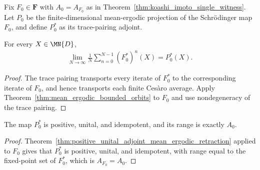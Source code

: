 \begin{definition}
    \label{def:koashi_imoto_mean_ergodic_projection}
    \leanok
    Fix $F_0\in\mathbf F$ with $A_0=A_{F_0}$ as in
    Theorem~\ref{thm:koashi_imoto_single_witness}. Let $P_0$ be the
    finite-dimensional mean-ergodic projection of the Schr\"odinger map $F_0$,
    and define $P_0^*$ as its trace-pairing adjoint.
\end{definition}

\begin{theorem}
    \label{thm:koashi_imoto_heisenberg_cesaro_convergence}
    \leanok
    For every $X\in\MN{D}$,
    \begin{align}
        \lim_{N\to\infty}\frac1N
        \sum_{n=0}^{N-1}(F_0^*)^n(X)
        =P_0^*(X).
        \label{eq:koashi_imoto_heisenberg_cesaro_convergence}
    \end{align}
\end{theorem}

\begin{proof}
    \leanok
    The trace pairing transports every iterate of $F_0^*$ to the corresponding
    iterate of $F_0$, and hence transports each finite Ces\`aro average.
    Apply Theorem~\ref{thm:mean_ergodic_bounded_orbits} to $F_0$ and use
    nondegeneracy of the trace pairing.
\end{proof}

\begin{theorem}
    \label{thm:koashi_imoto_mean_ergodic_projection_properties}
    \leanok
    The map $P_0^*$ is positive, unital, and idempotent, and its range is
    exactly $A_0$.
\end{theorem}

\begin{proof}
    \leanok
    Theorem~\ref{thm:positive_unital_adjoint_mean_ergodic_retraction} applied
    to $F_0$ gives that $P_0^*$ is positive, unital, and idempotent, with
    range equal to the fixed-point set of $F_0^*$, which is $A_{F_0}=A_0$.
\end{proof}

